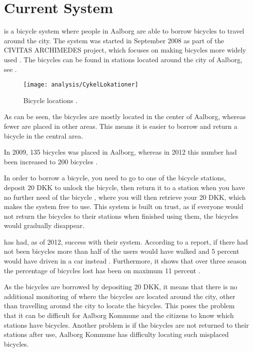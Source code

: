 \section{Current System}


\bycykel is a bicycle system where people in Aalborg are able to borrow bicycles to travel around the city.
The system was started in September 2008 as part of the CIVITAS ARCHIMEDES project, which focuses on making bicycles more widely used \citep{misc:aalborgcykling}.
The bicycles can be found in stations located around the city of Aalborg, see .

\begin{figure}[h]
	\centering
	\texttt{[image: analysis/CykelLokationer]}
	\caption{Bicycle locations \citep{misc:aalborgbycykel}.}
	\label{fig:CykelLokationer}
\end{figure}

As can be seen, the bicycles are mostly located in the center of Aalborg, whereas fewer are placed in other areas.
This means it is easier to borrow and return a bicycle in the central area.

In 2009, 135 bicycles was placed in Aalborg, whereas in 2012 this number had been increased to 200 bicycles \citep{misc:aalborgcykling}.

In order to borrow a bicycle, you need to go to one of the bicycle stations, deposit 20 DKK to unlock the bicycle, then return it to a station when you have no further need of the bicycle \citep{misc:aalborgbycykelregler}, where you will then retrieve your 20 DKK, which makes the system free to use.
This system is built on trust, as if everyone would not return the bicycles to their stations when finished using them, the bicycles would gradually disappear.

\bycykel has had, as of 2012, success with their system. According to a report, if there had not been bicycles more than half of the users would have walked and 5 percent would have driven in a car instead \citep{misc:aalborgcykling}.
Furthermore, it shows that over three season the percentage of bicycles lost has been on maximum 11 percent \citep{misc:aalborgcykling}.

As the bicycles are borrowed by depositing 20 DKK, it means that there is no additional monitoring of where the bicycles are located around the city, other than travelling around the city to locate the bicycles.
This poses the problem that it can be difficult for Aalborg Kommune and the citizens to know which stations have bicycles.
Another problem is if the bicycles are not returned to their stations after use, Aalborg Kommune has difficulty locating such misplaced bicycles.

